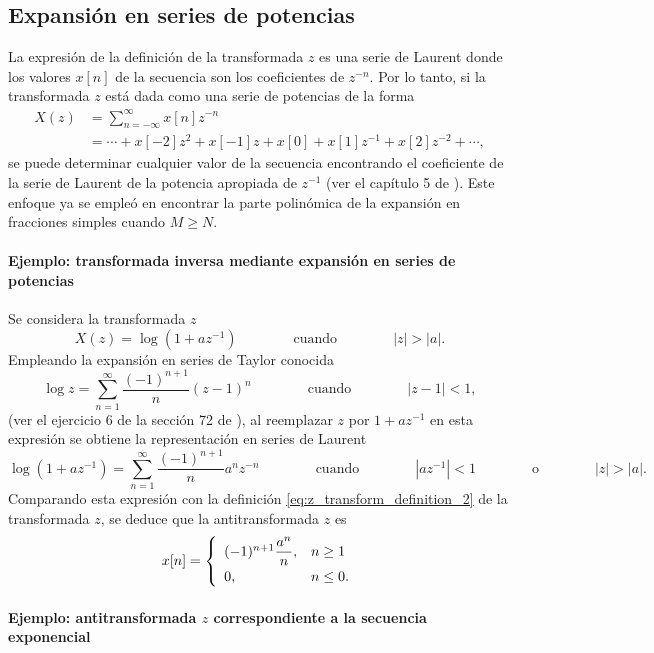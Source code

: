 \documentclass[a4paper]{report}
\begin{document}
\subsection{Expansión en series de potencias} 
 
La expresión de la definición de la transformada \(z\) es una serie de Laurent donde los valores \(x[n]\) de la secuencia son los coeficientes de \(z^{-n}\). Por lo tanto, si la transformada \(z\) está dada como una serie de potencias de la forma
\begin{equation}\label{eq:z_transform_definition_2}
 \begin{aligned}
  X(z)&=\sum_{n=-\infty}^\infty x[n]z^{-n}\\
  &=\cdots+x[-2]z^2+x[-1]z+x[0]+x[1]z^{-1}+x[2]z^{-2}+\cdots,
 \end{aligned}
\end{equation}
se puede determinar cualquier valor de la secuencia encontrando el coeficiente de la serie de Laurent de la potencia apropiada de \(z^{-1}\) (ver el capítulo 5 de \cite{brown2013complex}). Este enfoque ya se empleó en encontrar la  parte polinómica de la expansión en fracciones simples cuando \(M\geq N\).

\paragraph{Ejemplo: transformada inversa mediante expansión en series de potencias} Se considera la transformada \(z\) 
\[
 X(z)=\log(1+az^{-1})
 \qquad\qquad\textrm{cuando}\qquad\qquad
 |z|>|a|.
\]
Empleando la expansión en series de Taylor conocida
\[
 \log z=\sum_{n=1}^\infty\frac{(-1)^{n+1}}{n}(z-1)^n
 \qquad\qquad\textrm{cuando}\qquad\qquad
 |z-1|<1,
\]
(ver el ejercicio 6 de la sección 72 de \cite{brown2013complex}), al reemplazar \(z\) por \(1+az^{-1}\) en esta expresión se obtiene la representación en series de Laurent
\[
 \log(1+az^{-1})=\sum_{n=1}^\infty\frac{(-1)^{n+1}}{n}a^nz^{-n}
 \qquad\qquad\textrm{cuando}\qquad\qquad
 |az^{-1}|<1
 \qquad\qquad\textrm{o}\qquad\qquad
 |z|>|a|.
\]
Comparando esta expresión con la definición \ref{eq:z_transform_definition_2} de la transformada \(z\), se deduce que la antitransformada \(z\) es 
\[
 x[n]=
 \left\{
 \begin{array}{ll}
  (-1)^{n+1}\dfrac{a^n}{n}, & n\geq1\\[\medskipamount]
  0, & n\leq0.
 \end{array}
 \right.
\]

\paragraph{Ejemplo: antitransformada \(z\) correspondiente a la secuencia exponencial}
\end{document}
